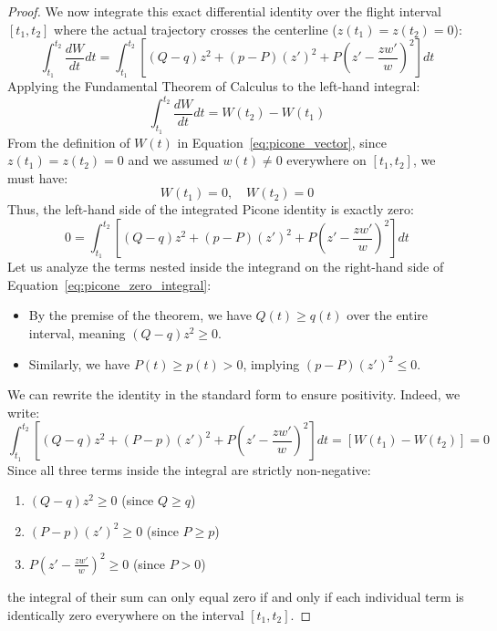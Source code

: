 \documentclass[11pt,a4paper]{book}
\begin{document}
\begin{proof}
We now integrate this exact differential identity over the flight interval $[t_1, t_2]$ where the actual trajectory crosses the centerline ($z(t_1) = z(t_2) = 0$):
\begin{equation}
\label{eq:picone_integration_step}
\int_{t_1}^{t_2} \frac{dW}{dt} dt = \int_{t_1}^{t_2} \left[ (Q - q) z^2 + (p - P)(z')^2 + P \left( z' - \frac{z w'}{w} \right)^2 \right] dt
\end{equation}
Applying the Fundamental Theorem of Calculus to the left-hand integral:
\begin{equation}
\label{eq:picone_left_hand}
\int_{t_1}^{t_2} \frac{dW}{dt} dt = W(t_2) - W(t_1)
\end{equation}
From the definition of $W(t)$ in Equation~\eqref{eq:picone_vector}, since $z(t_1) = z(t_2) = 0$ and we assumed $w(t) \ne 0$ everywhere on $[t_1, t_2]$, we must have:
\begin{equation}
\label{eq:picone_zeros}
W(t_1) = 0, \quad W(t_2) = 0
\end{equation}
Thus, the left-hand side of the integrated Picone identity is exactly zero:
\begin{equation}
\label{eq:picone_zero_integral}
0 = \int_{t_1}^{t_2} \left[ (Q - q) z^2 + (p - P)(z')^2 + P \left( z' - \frac{z w'}{w} \right)^2 \right] dt
\end{equation}
Let us analyze the terms nested inside the integrand on the right-hand side of Equation~\eqref{eq:picone_zero_integral}:
\begin{itemize}
\item By the premise of the theorem, we have $Q(t) \ge q(t)$ over the entire interval, meaning $(Q - q) z^2 \ge 0$.
\item Similarly, we have $P(t) \ge p(t) > 0$, implying $(p - P)(z')^2 \le 0$. 
\end{itemize}
We can rewrite the identity in the standard form to ensure positivity. Indeed, we write:
\begin{equation}
\label{eq:picone_inequality_step}
\int_{t_1}^{t_2} \left[ (Q - q) z^2 + (P - p)(z')^2 + P \left( z' - \frac{z w'}{w} \right)^2 \right] dt = \left[ W(t_1) - W(t_2) \right] = 0
\end{equation}
Since all three terms inside the integral are strictly non-negative:
\begin{enumerate}
\item $(Q - q) z^2 \ge 0$ (since $Q \ge q$)
\item $(P - p)(z')^2 \ge 0$ (since $P \ge p$)
\item $P \left( z' - \frac{z w'}{w} \right)^2 \ge 0$ (since $P > 0$)
\end{enumerate}
the integral of their sum can only equal zero if and only if each individual term is identically zero everywhere on the interval $[t_1, t_2]$.


\end{proof}
\end{document}

